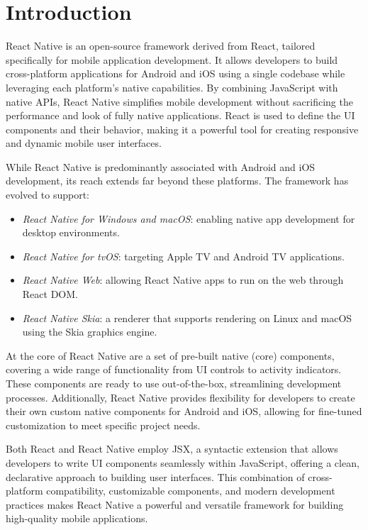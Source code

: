 \section{Introduction}

React Native is an open-source framework derived from React, tailored specifically for mobile application development. 
It allows developers to build cross-platform applications for Android and iOS using a single codebase while leveraging each platform's native capabilities. 
By combining JavaScript with native APIs, React Native simplifies mobile development without sacrificing the performance and look of fully native applications.
React is used to define the UI components and their behavior, making it a powerful tool for creating responsive and dynamic mobile user interfaces.

While React Native is predominantly associated with Android and iOS development, its reach extends far beyond these platforms. 
The framework has evolved to support:
\begin{itemize}
    \item \textit{React Native for Windows and macOS}: enabling native app development for desktop environments.
    \item \textit{React Native for tvOS}: targeting Apple TV and Android TV applications.
    \item \textit{React Native Web}: allowing React Native apps to run on the web through React DOM.
    \item \textit{React Native Skia}: a renderer that supports rendering on Linux and macOS using the Skia graphics engine.
\end{itemize}

At the core of React Native are a set of pre-built native (core) components, covering a wide range of functionality from UI controls to activity indicators. 
These components are ready to use out-of-the-box, streamlining development processes. 
Additionally, React Native provides flexibility for developers to create their own custom native components for Android and iOS, allowing for fine-tuned customization to meet specific project needs.

Both React and React Native employ JSX, a syntactic extension that allows developers to write UI components seamlessly within JavaScript, offering a clean, declarative approach to building user interfaces.
This combination of cross-platform compatibility, customizable components, and modern development practices makes React Native a powerful and versatile framework for building high-quality mobile applications.